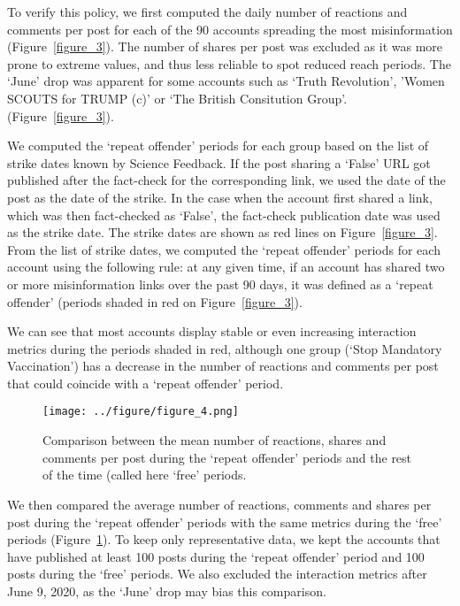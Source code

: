 \documentclass[sigconf]{acmart}
\begin{document}
To verify this policy, we first computed the daily number of reactions and comments per post for each of the 90 accounts spreading the most misinformation (Figure~\ref{figure_3}). The number of shares per post was excluded as it was more prone to extreme values, and thus less reliable to spot reduced reach periods. The `June' drop was apparent for some accounts such as `Truth Revolution', 'Women SCOUTS for TRUMP (c)' or `The British Consitution Group'. (Figure~\ref{figure_3}).

We computed the `repeat offender' periods for each group based on the list of strike dates known by Science Feedback. If the post sharing a `False' URL got published after the fact-check for the corresponding link, we used the date of the post as the date of the strike. In the case when the account first shared a link, which was then fact-checked as `False', the fact-check publication date was used as the strike date. The strike dates are shown as red lines on Figure~\ref{figure_3}. From the list of strike dates, we computed the `repeat offender' periods for each account using the following rule: at any given time, if an account has shared two or more misinformation links over the past 90 days, it was defined as a `repeat offender' (periods shaded in red on Figure~\ref{figure_3}).

We can see that most accounts display stable or even increasing interaction metrics during the periods shaded in red, although one group (`Stop Mandatory Vaccination') has a decrease in the number of reactions and comments per post that could coincide with a `repeat offender' period.

\begin{figure}[h]
  \centering
  \texttt{[image: ../figure/figure\_4.png]}
  \caption{Comparison between the mean number of reactions, shares and comments per post during the `repeat offender' periods and the rest of the time (called here `free' periods.}
  \label{figure_4}
\end{figure}

We then compared the average number of reactions, comments and shares per post during the `repeat offender' periods with the same metrics during the `free' periods (Figure~\ref{figure_4}). To keep only representative data, we kept the accounts that have published at least 100 posts during the `repeat offender' period and 100 posts during the `free' periods. We also excluded the interaction metrics after June 9, 2020, as the `June' drop may bias this comparison. 
\end{document}
